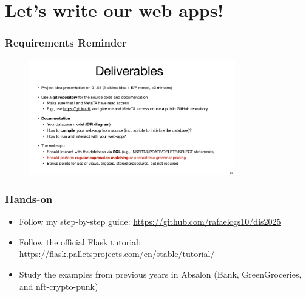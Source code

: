 \documentclass[fleqn,aspectratio=169,10pt]{beamer}
\begin{document}
\section{Let's write our web apps!}
\begin{frame}
  \frametitle{Requirements Reminder}
  \begin{figure}[]
    \centering
    \includegraphics[width=0.8\textwidth]{requirements.png}
  \end{figure}
\end{frame}

\begin{frame}
  \frametitle{Hands-on}
  \begin{itemize}
    \item Follow my step-by-step guide: \url{https://github.com/rafaelcgs10/dis2025}
    \item Follow the official Flask tutorial: \url{https://flask.palletsprojects.com/en/stable/tutorial/}
    \item Study the examples from previous years in Absalon (Bank, GreenGroceries, and nft-crypto-punk)
  \end{itemize}
\end{frame}
\end{document}
